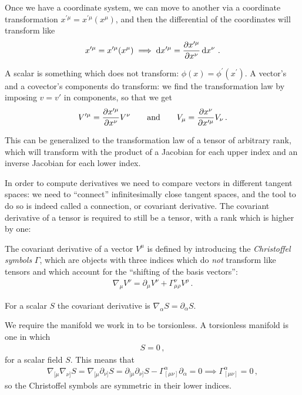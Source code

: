 \documentclass[main.tex]{subfiles}
\begin{document}
Once we have a coordinate system, we can move to another via a coordinate transformation \(x^{\prime \mu } = x^{\prime \mu } (x^{\mu }) \), and then the differential of the coordinates will transform like
%
\begin{align}
x^{\prime \mu } = x^{\prime \mu } \qty(x^{\mu })
\implies 
\dd{x^{\prime \mu }} = \pdv{x^{\prime \mu }}{x^{\nu }} \dd{x^{\nu }}
\,.
\end{align}

A scalar is something which does not transform: \(\phi (x) = \phi^{\prime } (x^{\prime })\).
A vector's and a covector's components do transform: we find the transformation law by imposing \(v = v'\) in components, so that we get 
%
\begin{align}
V^{\prime \mu } = \pdv{x^{\prime \mu }}{x^{\nu }} V^{\nu }
\qquad \text{and} \qquad
V_{\mu } = \pdv{x^{\nu }}{x^{\prime \mu }}V_{\nu }
\,.
\end{align}

This can be generalized to the transformation law of a tensor of arbitrary rank, which will transform with the product of a Jacobian for each upper index and an inverse Jacobian for each lower index.

In order to compute derivatives we need to compare vectors in different tangent spaces: we need to ``connect'' infinitesimally close tangent spaces, and the tool to do so is indeed called a connection, or covariant derivative. 
The covariant derivative of a tensor is required to still be a tensor, with a rank which is higher by one: 

The covariant derivative of a vector \(V^{\mu }\) is defined by introducing the \emph{Christoffel symbols} \(\Gamma \), which are objects with three indices which do \emph{not} transform like tensors and which account for the ``shifting of the basis vectors'':
%
\begin{align}
\nabla_{\mu } V^{\nu } = \partial_{\mu } V^{\nu } + \Gamma^{\nu }_{\mu \rho } V^{\rho }
\,.
\end{align}

For a scalar \(S\) the covariant derivative is \(\nabla_{\alpha } S = \partial_{\alpha } S\). 

We require the manifold we work in to be torsionless.
A torsionless manifold is one in which 
%
\begin{align}
[\nabla_{\mu }, \nabla_{\nu }] S = 0
\,,
\end{align}
%
for a scalar field \(S\). 
This means that 
%
\begin{align}
\nabla_{[\mu  } \nabla_{\nu ]} S = \nabla_{[\mu  } \partial_{\nu ]} S = \partial_{[\mu } \partial_{\nu ]} S - \Gamma^{\alpha }_{[\mu \nu ]} \partial_{\alpha } = 0
\implies \Gamma^{\alpha }_{[\mu \nu ]} = 0
\,,
\end{align}
%
so the Christoffel symbols are symmetric in their lower indices.  
\end{document}
